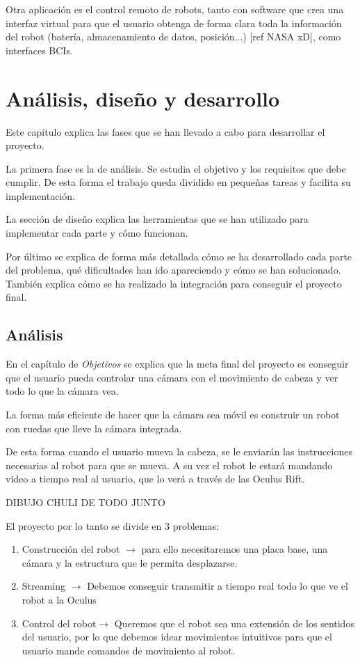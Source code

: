 \documentclass[twoside, 12pt]{epstfg}
\begin{document}
Otra aplicación es el control remoto de robots, tanto con software que crea una interfaz virtual para que el usuario obtenga de forma clara toda la información del robot (batería, almacenamiento de datos, posición...) [ref NASA xD], como interfaces BCIs.


\chapter{Análisis, diseño y desarrollo}
\label{chap:sistemadesarrollado}
Este capítulo explica las fases que se han llevado a cabo para desarrollar el proyecto.

La primera fase es la de análisis. Se estudia el objetivo y los requisitos que debe cumplir. De esta forma el trabajo queda dividido en pequeñas tareas y facilita su implementación.

La sección de diseño explica las herramientas que se han utilizado para implementar cada parte y cómo funcionan.

Por último se explica de forma más detallada cómo se ha desarrollado cada parte del problema, qué dificultades han ido apareciendo y cómo se han solucionado. También explica cómo se ha realizado la integración para conseguir el proyecto final.

\section{Análisis}
En el capítulo de \textit{Objetivos} se explica que la meta final del proyecto es conseguir que el usuario pueda controlar una cámara con el movimiento de cabeza y ver todo lo que la cámara vea.

La forma más eficiente de hacer que la cámara sea móvil es construir un robot con ruedas que lleve la cámara integrada. 

De esta forma cuando el usuario mueva la cabeza, se le enviarán las instrucciones necesarias al robot para que se mueva. A su vez el robot le estará mandando video a tiempo real al usuario, que lo verá a través de las Oculus Rift.

DIBUJO CHULI DE TODO JUNTO

El proyecto por lo tanto se divide en 3 problemas:
\begin{enumerate}
	\item Construcción del robot $\rightarrow$ para ello necesitaremos una placa base, una cámara y la estructura que le permita desplazarse.
	\item Streaming $\rightarrow$ Debemos conseguir transmitir a tiempo real todo lo que ve el robot a la Oculus
	\item Control del robot$\rightarrow$ Queremos que el robot sea una extensión de los sentidos del usuario, por lo que debemos idear movimientos intuitivos para que el usuario mande comandos de movimiento al robot.
\end{enumerate}
\end{document}
